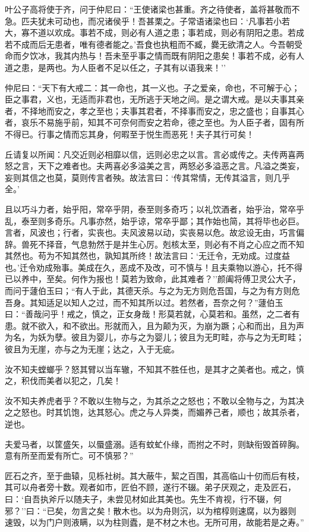 \documentclass[]{article}
\begin{document}
叶公子高将使于齐，问于仲尼曰：``王使诸梁也甚重。齐之待使者，盖将甚敬而不急。匹夫犹未可动也，而况诸侯乎！吾甚栗之。子常语诸梁也曰：`凡事若小若大，寡不道以欢成。事若不成，则必有人道之患；事若成，则必有阴阳之患。若成若不成而后无患者，唯有德者能之。'吾食也执粗而不臧，爨无欲清之人。今吾朝受命而夕饮冰，我其内热与！吾未至乎事之情而既有阴阳之患矣！事若不成，必有人道之患，是两也。为人臣者不足以任之，子其有以语我来！''

仲尼曰：``天下有大戒二：其一命也，其一义也。子之爱亲，命也，不可解于心；臣之事君，义也，无适而非君也，无所逃于天地之间。是之谓大戒。是以夫事其亲者，不择地而安之，孝之至也；夫事其君者，不择事而安之，忠之盛也；自事其心者，哀乐不易施乎前，知其不可奈何而安之若命，德之至也。为人臣子者，固有所不得已。行事之情而忘其身，何暇至于悦生而恶死！夫子其行可矣！

丘请复以所闻：凡交近则必相靡以信，远则必忠之以言。言必或传之。夫传两喜两怒之言，天下之难者也。夫两喜必多溢美之言，两怒必多溢恶之言。凡溢之类妄，妄则其信之也莫，莫则传言者殃。故法言曰：`传其常情，无传其溢言，则几乎全。'

且以巧斗力者，始乎阳，常卒乎阴，泰至则多奇巧；以礼饮酒者，始乎治，常卒乎乱，泰至则多奇乐。凡事亦然，始乎谅，常卒乎鄙；其作始也简，其将毕也必巨。言者，风波也；行者，实丧也。夫风波易以动，实丧易以危。故忿设无由，巧言偏辞。兽死不择音，气息勃然于是并生心厉。剋核太至，则必有不肖之心应之而不知其然也。苟为不知其然也，孰知其所终！故法言曰：`无迁令，无劝成。过度益也。'迁令劝成殆事。美成在久，恶成不及改，可不慎与！且夫乘物以游心，托不得已以养中，至矣。何作为报也！莫若为致命，此其难者？''颜阖将傅卫灵公大子，而问于蘧伯玉曰；``有人于此，其德天杀。与之为无方则危吾国，与之为有方则危吾身。其知适足以知人之过，而不知其所以过。若然者，吾奈之何？''蘧伯玉曰：``善哉问乎！戒之，慎之，正女身哉！形莫若就，心莫若和。虽然，之二者有患。就不欲入，和不欲出。形就而入，且为颠为灭，为崩为蹶；心和而出，且为声为名，为妖为孽。彼且为婴儿，亦与之为婴儿；彼且为无町畦，亦与之为无町畦；彼且为无崖，亦与之为无崖；达之，入于无疵。

汝不知夫螳螂乎？怒其臂以当车辙，不知其不胜任也，是其才之美者也。戒之，慎之，积伐而美者以犯之，几矣！

汝不知夫养虎者乎？不敢以生物与之，为其杀之之怒也；不敢以全物与之，为其决之之怒也。时其饥饱，达其怒心。虎之与人异类，而媚养己者，顺也；故其杀者，逆也。

夫爱马者，以筐盛矢，以蜃盛溺。适有蚊虻仆缘，而拊之不时，则缺衔毁首碎胸。意有所至而爱有所亡。可不慎邪？''

匠石之齐，至于曲辕，见栎社树。其大蔽牛，絜之百围，其高临山十仞而后有枝，其可以舟者旁十数。观者如市，匠伯不顾，遂行不辍。弟子厌观之，走及匠石，曰：`自吾执斧斤以随夫子，未尝见材如此其美也。先生不肯视，行不辍，何邪？''曰：``已矣，勿言之矣！散木也。以为舟则沉，以为棺椁则速腐，以为器则速毁，以为门户则液瞒，以为柱则蠹，是不材之木也。无所可用，故能若是之寿。''
\end{document}
